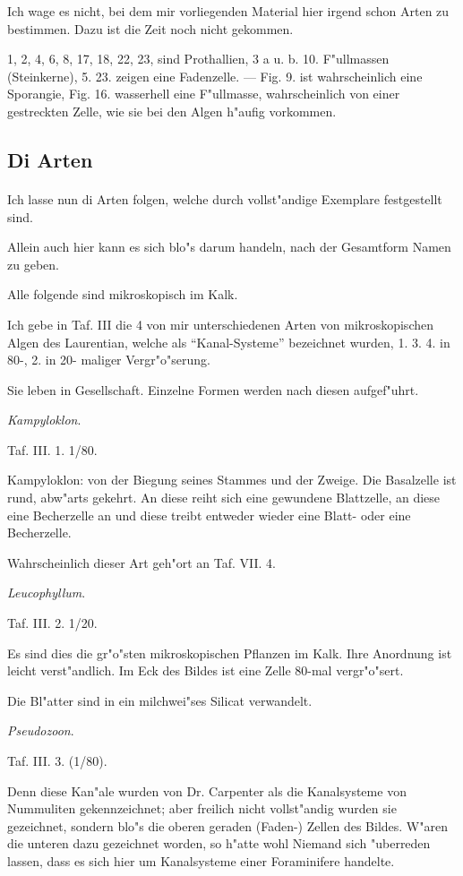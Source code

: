 \documentclass[a4paper, 11pt, oneside, german]{article}
\begin{document}
Ich wage es nicht, bei dem mir vorliegenden Material hier irgend schon Arten zu bestimmen. Dazu ist die Zeit noch nicht gekommen.

1, 2, 4, 6, 8, 17, 18, 22, 23, sind Prothallien, 3 a u. b. 10. F"ullmassen (Steinkerne), 5. 23. zeigen eine Fadenzelle. --- Fig. 9. ist wahrscheinlich eine Sporangie, Fig. 16. wasserhell eine F"ullmasse, wahrscheinlich von einer gestreckten Zelle, wie sie bei den Algen h"aufig vorkommen.
\clearpage
\subsection{Di Arten}
\paragraph{}
Ich lasse nun di Arten folgen, welche durch vollst"andige Exemplare festgestellt sind.

Allein auch hier kann es sich blo"s darum handeln, nach der Gesamtform Namen zu geben.

Alle folgende sind mikroskopisch im Kalk.

Ich gebe in Taf. III die 4 von mir unterschiedenen Arten von mikroskopischen Algen des Laurentian, welche als "`Kanal-Systeme"' bezeichnet wurden, 1. 3. 4. in 80-, 2. in 20- maliger Vergr"o"serung.

Sie leben in Gesellschaft. Einzelne Formen werden nach diesen aufgef"uhrt.

\emph{Kampyloklon}.

Taf. III. 1. 1/80.

Kampyloklon: von der Biegung seines Stammes und der Zweige. Die Basalzelle ist rund, abw"arts gekehrt. An diese reiht sich eine gewundene Blattzelle, an diese eine Becherzelle an und diese treibt entweder wieder eine Blatt- oder eine Becherzelle.

Wahrscheinlich dieser Art geh"ort an Taf. VII. 4.

\emph{Leucophyllum}.

Taf. III. 2. 1/20.

Es sind dies die gr"o"sten mikroskopischen Pflanzen im Kalk. Ihre Anordnung ist leicht verst"andlich. Im Eck des Bildes ist eine Zelle 80-mal vergr"o"sert.

Die Bl"atter sind in ein milchwei"ses Silicat verwandelt.

\emph{Pseudozoon}.

Taf. III. 3. (1/80).

Denn diese Kan"ale wurden von Dr. Carpenter als die Kanalsysteme von Nummuliten gekennzeichnet; aber freilich nicht vollst"andig wurden sie gezeichnet, sondern blo"s die oberen geraden (Faden-) Zellen des Bildes. W"aren die unteren dazu gezeichnet worden, so h"atte wohl Niemand sich "uberreden lassen, dass es sich hier um Kanalsysteme einer Foraminifere handelte.
\end{document}
